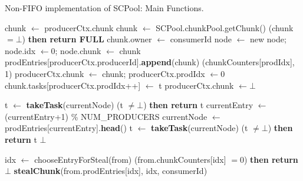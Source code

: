 \begin{algo}[!ht]
\caption{Non-FIFO implementation of SCPool: Main Functions.} 
\label{alg:non-fifo}
\scriptsize
\begin{minipage}[t]{0.48\textwidth}
\begin{distribalgo}[1]
\setcounter{ALC@line}{\value{alg:non-fifo:lines}}
\smallskip
{}
	\STATE chunk $\leftarrow$ producerCtx.chunk
		\STATE chunk $\leftarrow$ SCPool.chunkPool.getChunk()
		 (chunk $= \bot$) {\bf then return FULL} 
		\STATE chunk.owner $\leftarrow$ consumerId
		\STATE node $\leftarrow$ new node; node.idx $\leftarrow 0$; node.chunk $\leftarrow$ chunk
		\STATE prodEntries[producerCtx.producerId].{\bf append}(chunk)
		(chunkCounters[prodIdx], 1)
		\STATE producerCtx.chunk $\leftarrow$ chunk; producerCtx.prodIdx $\leftarrow 0$ 
	\ENDINDENT
	\STATE chunk.tasks[producerCtx.prodIdx++] $\leftarrow$ t
	  \STATE producerCtx.chunk $\leftarrow \bot$ 
	\ENDINDENT
\ENDINDENT

\medskip

		\STATE t $\leftarrow$ {\bf takeTask}(currentNode)
		 (t $\neq \bot$) {\bf then return} t
	\ENDINDENT
		\STATE currentEntry $\leftarrow$ (currentEntry+1) \% NUM\_PRODUCERS
  	\STATE currentNode $\leftarrow$ prodEntries[currentEntry].{\bf head}()
  		\STATE t $\leftarrow$ {\bf takeTask}(currentNode)
			 (t $\neq \bot$) {\bf then return} t
  	\ENDINDENT
	\ENDINDENT
	 $\bot$
\ENDINDENT

\medskip

	\STATE idx $\leftarrow$ chooseEntryForSteal(from)
	(from.chunkCounters[idx] $= 0$) {\bf then return} $\bot$
	 {\bf stealChunk}(from.prodEntries[idx], idx, consumerId)
\ENDINDENT
	
\setcounter{alg:non-fifo:lines}{\value{ALC@line}} %
\end{distribalgo}
\end{minipage}%
%
\hfill
%
\begin{minipage}[t]{0.48\textwidth}
%
\begin{distribalgo}[1]
\setcounter{ALC@line}{\value{alg:non-fifo:lines}}
\smallskip


\end{distribalgo}
\end{minipage}
\end{algo}
